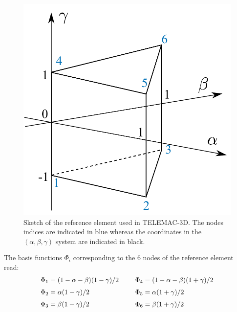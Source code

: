 \begin{figure}
\begin{center}
\includegraphics[scale=0.5]{./graphics/reference_element.pdf}
\end{center}
\caption{Sketch of the reference element used in TELEMAC-3D. The nodes indices
are indicated in blue whereas the coordinates in the $(\alpha, \beta, \gamma)$
system are indicated in black.}
\label{fig:reference_element}
\end{figure}

The basis functions $\Phi_i$ corresponding to the 6 nodes of the reference element read:
\begin{equation}
\begin{array}{ll}
\Phi_1 = (1-\alpha-\beta)(1-\gamma)/2 \hspace{0.5cm}& \Phi_4 = (1 - \alpha - \beta)(1 + \gamma)/2 \medskip \\
\Phi_2 = \alpha(1 - \gamma)/2 &\Phi_5 = \alpha(1 + \gamma)/2 \medskip \\
\Phi_3 = \beta(1 - \gamma)/2 &\Phi_6 = \beta(1 + \gamma)/2
\end{array}
\end{equation}

